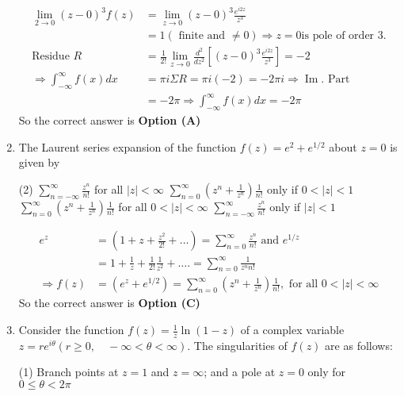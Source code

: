 \begin{note}
\begin{enumerate}[label=\color{ocre}\textbf{\arabic*.}]
\begin{answer}
\begin{align*}
		\lim _{2 \rightarrow 0}(z-0)^{3} f(z)&=\lim _{z \rightarrow 0}(z-0)^{3} \frac{e^{i 2 z}}{z^{3}}\\&=1(\text{ finite and }\neq 0) \Rightarrow z=0 \text{is pole of order 3} .\\
		\text{Residue }R&=\frac{1}{2 !} \lim _{z \rightarrow 0} \frac{d^{2}}{d z^{2}}\left[(z-0)^{3} \frac{e^{i 2 z}}{z^{3}}\right]=-2\\
		\Rightarrow \int_{-\infty}^{\infty} f(x) d x&=\pi i \Sigma R=\pi i(-2)=-2 \pi i \Rightarrow \operatorname{Im} .\text{ Part }\\&=-2 \pi \Rightarrow \int_{-\infty}^{\infty} f(x) d x=-2 \pi
		\end{align*}
		So the correct answer is \textbf{Option (A)}
	\end{answer}
	\item The Laurent series expansion of the function $f(z)=e^{2}+e^{1 / 2}$ about $z=0$ is given by
	{}
	\begin{tasks}(2)
		\task[\textbf{A.}] $\sum_{n=-\infty}^{\infty} \frac{z^{n}}{n !}$ for all $|z|<\infty$
		\task[\textbf{B.}] $\sum_{n=0}^{\infty}\left(z^{n}+\frac{1}{z^{n}}\right) \frac{1}{n !}$ only if $0<|z|<1$
		\task[\textbf{C.}] $\sum_{n=0}^{\infty}\left(z^{n}+\frac{1}{z^{n}}\right) \frac{1}{n !}$ for all $0<|z|<\infty$
		\task[\textbf{D.}]  $\sum_{n=-\infty}^{\infty} \frac{z^{n}}{n !}$ only if $|z|<1$
	\end{tasks}
	\begin{answer}
		\begin{align*}
		e^{z}&=\left(1+z+\frac{z^{2}}{2 !}+\ldots\right)=\sum_{n=0}^{\infty} \frac{z^{n}}{n !}\text{ and }e^{1 / z}\\&=1+\frac{1}{z}+\frac{1}{2 !} \frac{1}{z^{2}}+\ldots .=\sum_{n=0}^{\infty} \frac{1}{z^{n} n !}\\
		\Rightarrow f(z)&=\left(e^{z}+e^{1 / 2}\right)=\sum_{n=0}^{\infty}\left(z^{n}+\frac{1}{z^{n}}\right) \frac{1}{n !},\text{ for all }0<|z|<\infty
		\end{align*}
		So the correct answer is \textbf{Option (C)}
	\end{answer}
	\item Consider the function $f(z)=\frac{1}{z} \ln (1-z)$ of a complex variable $z=r e^{i \theta}(r \geq 0, \quad-\infty<\theta<\infty)$. The singularities of $f(z)$ are as follows:
	{}
	\begin{tasks}(1)
		\task[\textbf{A.}]  Branch points at $z=1$ and $z=\infty$; and a pole at $z=0$ only for $0 \leq \theta<2 \pi$

\end{tasks}
\end{enumerate}
\end{note}
